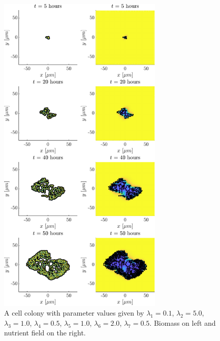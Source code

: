 \begin{figure}[!htb] %
    \centering
    \includegraphics[width= 0.7\textwidth]{
        chapter2/figures/t_all_L1_0o10_L2_5o00_L3_1o00_L4_0o50_L5_1o00_L6_2o00_L7_0o50.pdf}
    \caption{A cell colony with parameter values given by
             $\lambda_1 = 0.1$,  
             $\lambda_2 = 5.0$, 
             $\lambda_3 = 1.0$, 
             $\lambda_4 = 0.5$, 
             $\lambda_5 = 1.0$, 
             $\lambda_6 = 2.0$, 
             $\lambda_7 = 0.5$. 
             Biomass on left and nutrient field on the right.}
    \label{fig: sdsd}
\end{figure}

\newpage

